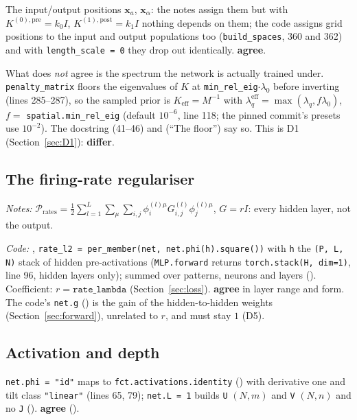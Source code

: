 \documentclass[11pt,a4paper]{article}
\newcommand{\code}[1]{\texttt{#1}}
\newcommand{\agree}{\textbf{agree}}
\newcommand{\differ}{\textbf{differ}}
\begin{document}
The input/output positions $\mathbf x_a$, $\mathbf x_\alpha$: the notes assign them but with $K^{(0),\mathrm{pre}} = k_0I$, $K^{(1),\mathrm{post}} = k_1I$ nothing depends on them; the code assigns grid positions to the input and output populations too (\code{build\_spaces}, 360 and 362) and with \code{length\_scale = 0} they drop out identically. \agree.

What does \emph{not} agree is the spectrum the network is actually trained under. \code{penalty\_matrix} floors the eigenvalues of $K$ at \code{min\_rel\_eig}$\cdot\lambda_0$ before inverting (lines 285--287), so the sampled prior is $K_{\mathrm{eff}} = M^{-1}$ with $\lambda_q^{\mathrm{eff}} = \max(\lambda_q, f\lambda_0)$, $f = $ \code{spatial.min\_rel\_eig} (default $10^{-6}$, line 118; the pinned commit's presets use $10^{-2}$). The docstring (41--46) and  (``The floor'') say so. This is D1 (Section~\ref{sec:D1}): \differ.

\subsection{The firing-rate regulariser}
\emph{Notes:} $\mathcal P_{\mathrm{rates}} = \frac12\sum_{l=1}^L\sum_\mu\sum_{i,j}\phi^{(l)\mu}_iG^{(l)}_{i,j}\phi^{(l)\mu}_j$, $G = rI$: every hidden layer, not the output.

\emph{Code:} , \code{rate\_l2 = per\_member(net, net.phi(h).square())} with \code{h} the \code{(P, L, N)} stack of hidden pre-activations (\code{MLP.forward} returns \code{torch.stack(H, dim=1)}, line 96, hidden layers only); summed over patterns, neurons and layers (). Coefficient: $r = \code{rate\_lambda}$ (Section~\ref{sec:loss}). \agree{} in layer range and form. The code's \code{net.g} () is the gain of the hidden-to-hidden weights (Section~\ref{sec:forward}), unrelated to $r$, and must stay $1$ (D5).

\subsection{Activation and depth}
\code{net.phi = "id"} maps to \code{fct.activations.identity} () with derivative one and tilt class \code{"linear"} (lines 65, 79); \code{net.L = 1} builds \code{U} $(N, m)$ and \code{V} $(N, n)$ and no \code{J} (). \agree{} ().
\end{document}
